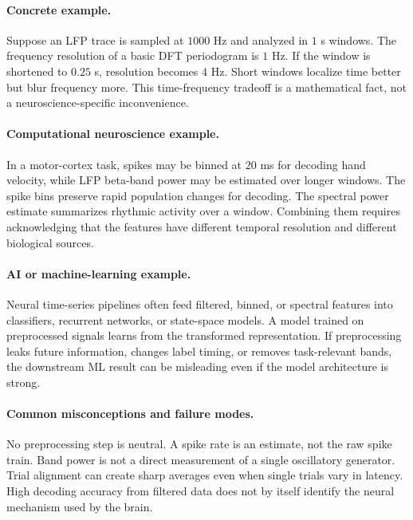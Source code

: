 \paragraph{Concrete example.}
Suppose an LFP trace is sampled at \(1000\) Hz and analyzed in \(1\) s windows. The frequency resolution of a basic DFT periodogram is \(1\) Hz. If the window is shortened to \(0.25\) s, resolution becomes \(4\) Hz. Short windows localize time better but blur frequency more. This time-frequency tradeoff is a mathematical fact, not a neuroscience-specific inconvenience.

\paragraph{Computational neuroscience example.}
In a motor-cortex task, spikes may be binned at \(20\) ms for decoding hand velocity, while LFP beta-band power may be estimated over longer windows. The spike bins preserve rapid population changes for decoding. The spectral power estimate summarizes rhythmic activity over a window. Combining them requires acknowledging that the features have different temporal resolution and different biological sources.

\paragraph{AI or machine-learning example.}
Neural time-series pipelines often feed filtered, binned, or spectral features into classifiers, recurrent networks, or state-space models. A model trained on preprocessed signals learns from the transformed representation. If preprocessing leaks future information, changes label timing, or removes task-relevant bands, the downstream ML result can be misleading even if the model architecture is strong.

\paragraph{Common misconceptions and failure modes.}
No preprocessing step is neutral. A spike rate is an estimate, not the raw spike train. Band power is not a direct measurement of a single oscillatory generator. Trial alignment can create sharp averages even when single trials vary in latency. High decoding accuracy from filtered data does not by itself identify the neural mechanism used by the brain.

